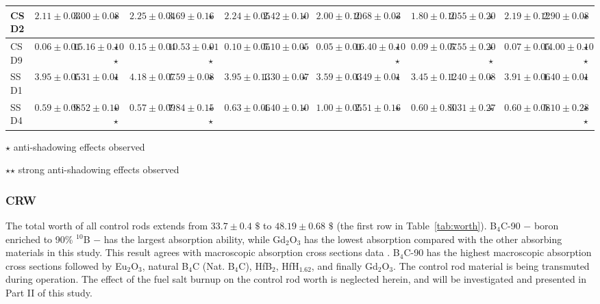 \begin{sidewaystable}
\begin{tabularx}{\textwidth}{|p{1.8cm}|p{0.56cm}|p{0.5cm}|p{0.49cm}|p{0.56cm}|p{0.5cm}|p{0.49cm}| 
	p{0.56cm}|p{0.5cm}|p{0.49cm}|p{0.56cm}|p{0.5cm}|p{0.49cm}| 
	p{0.56cm}|p{0.5cm}|p{0.49cm}|p{0.56cm}|p{0.5cm}|p{0.49cm}|}
		\hline 
		CSD2			 &  $2.11\pm0.03$	&$3.00\pm0.08$	&	$\star$				& $2.25\pm0.04$   &$3.69\pm0.16$	&$\star$	&$2.24\pm0.05$	&$2.42\pm0.10$	&$\star$	&$2.00\pm0.10$	&$2.68\pm0.03$	&$\star$	&$1.80\pm0.10$	&$2.55\pm0.20$	&$\star$	&$2.19\pm0.12$	&$2.90\pm0.08$	&$\star$ \\
		\hline 
		CSD9			 &  $0.06\pm0.01$	&$15.16\pm0.10$	&	$\star$$\star$				& $0.15\pm0.04$   & $10.53\pm0.01$	&$\star$$\star$	&$0.10\pm0.05$	&$5.10\pm0.05$	&$\star$	&$0.05\pm0.01$	&$16.40\pm0.10$	&$\star$$\star$	&$0.09\pm0.07$	&$5.55\pm0.20$	&$\star$$\star$	&$0.07\pm0.05$	&$14.00\pm0.10$	&$\star$$\star$ \\ 
		\hline
		SSD1		 &  $3.95\pm0.05$	&$1.31\pm0.01$	&	$\star$		& $4.18\pm0.07$   &$1.59\pm0.08$	&$\star$	&$3.95\pm0.13$	&$1.30\pm0.07$	&$\star$	&$3.59\pm0.03$	&$1.49\pm0.01$	&$\star$	&$3.45\pm0.12$	&$1.40\pm0.08$	&$\star$	&$3.91\pm0.06$	&$1.40\pm0.01$&$\star$ \\
		\hline 
		SSD4		 &  $0.59\pm0.08$	& $9.52\pm0.10$	&	$\star$$\star$		&  $0.57\pm0.09$  &$7.84\pm0.15$	&$\star$$\star$	&$0.63\pm0.06$	&$4.40\pm0.10$	&$\star$	&$1.00\pm0.05$	&$2.51\pm0.16$	&$\star$	&$0.60\pm0.80$	&$3.31\pm0.27$	&$\star$	&$0.60\pm0.08$	&$5.10\pm0.28$	&$\star$$\star$ \\
		\hline
	\end{tabularx}
	\begin{tablenotes}
		\tiny
		\item  $\star$  anti-shadowing effects observed
		\item  $\star$$\star$ strong anti-shadowing effects observed
	\end{tablenotes}
	\label{tab:worth}
\end{sidewaystable}

\subsubsection{CRW} \label{CR_worth}

The total worth of all control rods extends from $33.7\pm0.4$ $\$$ to $48.19\pm0.68$ 
$\$$ (the first row in Table~\ref{tab:worth}). B$_4$C-90 $-$ boron enriched to 90\% $^{10}$B $-$
has the largest absorption ability, while Gd$_2$O$_3$ has the lowest 
absorption compared with the other absorbing materials in this study. This 
result agrees with macroscopic absorption cross sections data 
\cite{guo2019optimized}. B$_4$C-90 has the highest macroscopic 
absorption cross sections followed by Eu$_2$O$_3$, natural B$_4$C (Nat. B$_4$C), HfB$_2$, HfH$_{1.62}$, and 
finally Gd$_2$O$_3$. The control rod material is being transmuted during 
operation. The effect of the fuel salt burnup on the control rod worth is neglected
herein, and will be investigated and presented in Part II of this 
study.

